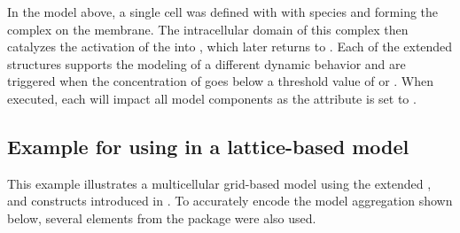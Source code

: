 In the model above, a single cell was defined with with species  and  forming the complex  on the membrane. The intracellular domain of this complex then catalyzes the activation of the  into , which later returns to . Each of the extended \Event structures supports the modeling of a different dynamic behavior and are triggered when the concentration of  goes below a threshold value of  or . When executed, each \Event will impact all model components as the  attribute is set to .

\subsection{Example for using  in a lattice-based model}

This example illustrates a multicellular grid-based model using the extended \SBase, \Event and \Compartment constructs introduced in . To accurately encode the model aggregation shown below, several elements from the  package were also used.

